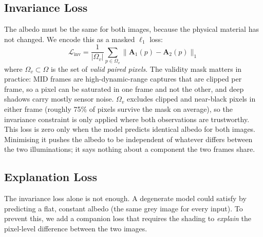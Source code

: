 \subsection{Invariance Loss}

The albedo must be the same for both images, because the physical material has not
changed.
We encode this as a masked $\ell_1$ loss:
\begin{equation}
  \mathcal{L}_{\text{inv}} =
  \frac{1}{|\Omega_v|} \sum_{p \in \Omega_v}
  \bigl\| \mathbf{A}_1(p) - \mathbf{A}_2(p) \bigr\|_1
  \label{eq:linv}
\end{equation}
where $\Omega_v \subset \Omega$ is the set of \emph{valid paired pixels}.
The validity mask matters in practice: MID frames are high-dynamic-range captures
that are clipped per frame, so a pixel can be saturated in one frame and not the
other, and deep shadows carry mostly sensor noise.
$\Omega_v$ excludes clipped and near-black pixels in either frame (roughly 75\%
of pixels survive the mask on average), so the invariance constraint is only
applied where both observations are trustworthy.
This loss is zero only when the model predicts identical albedo for both images.
Minimising it pushes the albedo to be independent of whatever differs between the two
illuminations; it says nothing about a component the two frames share.

\subsection{Explanation Loss}

The invariance loss alone is not enough.
A degenerate model could satisfy  by predicting a flat, constant
albedo (the same grey image for every input).
To prevent this, we add a companion loss that requires the shading to \emph{explain}
the pixel-level difference between the two images.

